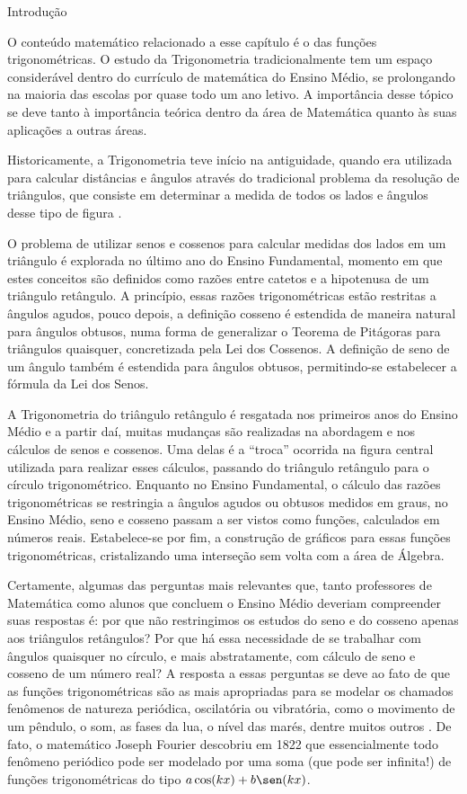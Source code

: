 \mainmatter

\begin{apresentacao}{Introdução}

O conteúdo matemático relacionado a esse capítulo é o das funções trigonométricas. O estudo da Trigonometria tradicionalmente tem um espaço considerável dentro do currículo de matemática do Ensino Médio, se prolongando na maioria das escolas por quase todo um ano letivo. A importância desse tópico se deve tanto à importância teórica dentro da área de Matemática quanto às suas aplicações a outras áreas.

Historicamente, a Trigonometria teve início na antiguidade, quando era utilizada para calcular distâncias e ângulos através do tradicional problema da resolução de triângulos, que consiste em determinar a medida de todos os lados e ângulos desse tipo de figura \citep{Lima2006}.

O problema de utilizar senos e cossenos para calcular medidas dos lados em um triângulo é explorada no último ano do Ensino Fundamental, momento em que estes conceitos são definidos como razões entre catetos e a hipotenusa de um triângulo retângulo. A princípio, essas razões trigonométricas estão restritas a ângulos agudos, pouco depois, a definição cosseno é estendida de maneira natural para ângulos obtusos, numa forma de generalizar o Teorema de Pitágoras para triângulos quaisquer, concretizada pela Lei dos Cossenos. A definição de seno de um ângulo também é estendida para ângulos obtusos, permitindo-se estabelecer a fórmula da Lei dos Senos.

A Trigonometria do triângulo retângulo é resgatada nos primeiros anos do Ensino Médio e a partir daí, muitas mudanças são realizadas na abordagem e nos cálculos de senos e cossenos. Uma delas é a “troca”{} ocorrida na figura central utilizada para realizar esses cálculos, passando do triângulo retângulo para o círculo trigonométrico. Enquanto no Ensino Fundamental, o cálculo das razões trigonométricas se restringia a ângulos agudos ou obtusos medidos em graus, no Ensino Médio, seno e cosseno passam a ser vistos como funções, calculados em números reais. Estabelece-se por fim, a construção de gráficos para essas funções trigonométricas, cristalizando uma interseção sem volta com a área de Álgebra.  

Certamente, algumas das perguntas mais relevantes que, tanto professores de Matemática como alunos que concluem o Ensino Médio deveriam compreender suas respostas é: por que não restringimos os estudos do seno e do cosseno apenas aos triângulos retângulos? Por que há essa necessidade de se trabalhar com ângulos quaisquer no círculo, e mais abstratamente, com cálculo de seno e cosseno de um número real? A resposta a essas perguntas se deve ao fato de que as funções trigonométricas são as mais apropriadas para se modelar os chamados fenômenos de natureza periódica, oscilatória ou vibratória, como o movimento de um pêndulo, o som, as fases da lua, o nível das marés, dentre muitos outros \citep{Lima2006}. De fato, o matemático Joseph Fourier descobriu em 1822 que essencialmente todo fenômeno periódico pode ser modelado por uma soma (que pode ser infinita!) de funções trigonométricas do tipo $a\cos(kx)+b\sen(kx)$.


\end{apresentacao}
